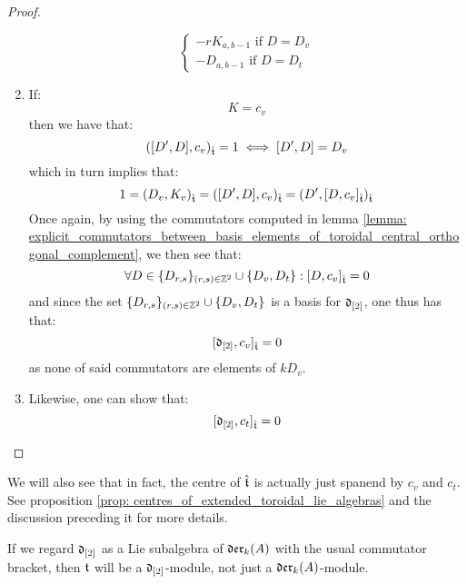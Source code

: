 \begin{proof}
\begin{enumerate}
$$\begin{cases}
                                \text{$-r K_{a, b - 1}$ if $D = D_v$}
                                \\
                                \text{$- D_{a, b - 1}$ if $D = D_t$}
                            \end{cases}
                        $$
                    \item If:
                        $$K = c_v$$
                    then we have that:
                        $$([D', D], c_v)_{\hat{\mathfrak{t}}} = 1 \iff [D', D] = D_v$$
                    which in turn implies that:
                        $$1 = (D_v, K_v)_{\hat{\mathfrak{t}}} = ([D', D], c_v)_{\hat{\mathfrak{t}}} = (D', [D, c_v]_{\hat{\mathfrak{t}}})_{\hat{\mathfrak{t}}}$$
                    Once again, by using the commutators computed in lemma \ref{lemma: explicit_commutators_between_basis_elements_of_toroidal_central_orthogonal_complement}, we then see that:
                        $$\forall D \in \{D_{r, s}\}_{(r, s) \in \mathbb{Z}^2} \cup \{D_v, D_t\}: [D, c_v]_{\hat{\mathfrak{t}}} = 0$$
                    and since the set $\{D_{r, s}\}_{(r, s) \in \mathbb{Z}^2} \cup \{D_v, D_t\}$ is a basis for $\mathfrak{d}_{[2]}$, one thus has that:
                        $$[\mathfrak{d}_{[2]}, c_v]_{\hat{\mathfrak{t}}} = 0$$
                    as none of said commutators are elements of $k D_v$.
                    \item Likewise, one can show that:
                        $$[\mathfrak{d}_{[2]}, c_t]_{\hat{\mathfrak{t}}} = 0$$
                \end{enumerate}
            \end{proof}
        We will also see that in fact, the centre of $\hat{\mathfrak{t}}$ is actually just spanend by $c_v$ and $c_t$. See proposition \ref{prop: centres_of_extended_toroidal_lie_algebras} and the discussion preceding it for more details.
        
        \begin{proposition} \label{prop: toroidal_lie_algebras_as_modules_over_div_0_vector_field_lie_algebras}
            If we regard $\mathfrak{d}_{[2]}$ as a Lie subalgebra of $\mathfrak{der}_{k}(A)$ with the usual commutator bracket, then $\mathfrak{t}$ will be a $\mathfrak{d}_{[2]}$-module, not just a $\mathfrak{der}_k(A)$-module.
        \end{proposition}
        
